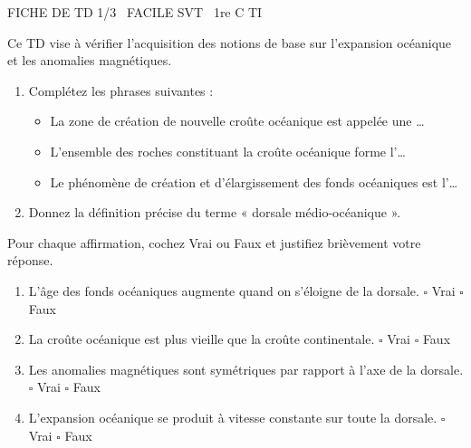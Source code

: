 \documentclass[11pt]{article}
\begin{document}
\begin{tcolorbox}[enhanced,colback=popink,colframe=popink,arc=10pt,boxrule=0pt,left=12pt,right=12pt,top=9pt,bottom=9pt]
{\color{white}\popxbold\small FICHE DE TD 1/3 \textbullet\ FACILE \hfill SVT \textbullet\ 1re C TI\par}
\end{tcolorbox}
\vspace{4pt}
Ce TD vise à vérifier l'acquisition des notions de base sur l'expansion océanique et les anomalies magnétiques.

\begin{exercice}
\begin{enumerate}
    \item Complétez les phrases suivantes :
    \begin{itemize}
        \item La zone de création de nouvelle croûte océanique est appelée une \ldots
        \item L'ensemble des roches constituant la croûte océanique forme l'\ldots
        \item Le phénomène de création et d'élargissement des fonds océaniques est l'\ldots
    \end{itemize}
    \item Donnez la définition précise du terme « dorsale médio-océanique ».
\end{enumerate}
\end{exercice}

\begin{exercice}
Pour chaque affirmation, cochez Vrai ou Faux et justifiez brièvement votre réponse.
\begin{enumerate}
    \item L'âge des fonds océaniques augmente quand on s'éloigne de la dorsale. \hfill $\square$ Vrai $\square$ Faux
    \item La croûte océanique est plus vieille que la croûte continentale. \hfill $\square$ Vrai $\square$ Faux
    \item Les anomalies magnétiques sont symétriques par rapport à l'axe de la dorsale. \hfill $\square$ Vrai $\square$ Faux
    \item L'expansion océanique se produit à vitesse constante sur toute la dorsale. \hfill $\square$ Vrai $\square$ Faux
\end{enumerate}
\end{exercice}
\end{document}
